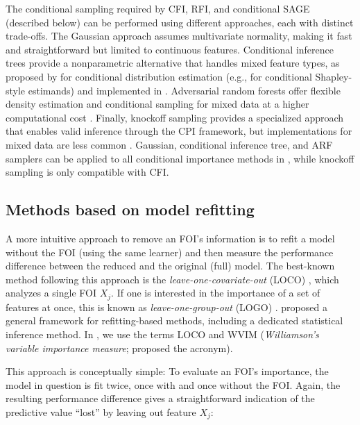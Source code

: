 The conditional sampling required by CFI, RFI, and conditional SAGE (described below) can be performed using different approaches, each with distinct trade-offs.
The Gaussian approach assumes multivariate normality, making it fast and straightforward but limited to continuous features.
Conditional inference trees provide a nonparametric alternative that handles mixed feature types, as proposed by \citet{redelmeier2020explainingpredictive} for conditional distribution estimation (e.g., for conditional Shapley-style estimands) and implemented in .
Adversarial random forests offer flexible density estimation and conditional sampling for mixed data at a higher computational cost \citep{watson2023adversarialrandom}.
Finally, knockoff sampling provides a specialized approach that enables valid inference through the CPI framework, but implementations for mixed data are less common \citep{candes2018panninggoldd, blesch2024conditionalfeature}.
Gaussian, conditional inference tree, and ARF samplers can be applied to all conditional importance methods in , while knockoff sampling is only compatible with CFI.

\subsection{Methods based on model refitting}\label{sec-fi-refit}

A more intuitive approach to remove an FOI's information is to refit a model without the FOI (using the same learner) and then measure the performance difference between the reduced and the original (full) model.
The best-known method following this approach is the \emph{leave-one-covariate-out} (LOCO) \citep{lei2018distributionfreepredictivec}, which analyzes a single FOI \(X_j\).
If one is interested in the importance of a set of features at once,
this is known as \emph{leave-one-group-out} (LOGO) \citep{au2022grouped}.
\citet{williamson2023generalframeworkb} proposed a general framework for refitting-based methods, including a dedicated statistical inference method.
In , we use the terms LOCO and WVIM (\emph{Williamson's variable importance measure}; \citet{ewald2024guidefeatureb} proposed the acronym).

This approach is conceptually simple: To evaluate an FOI's importance, the model in question is fit twice, once with and once without the FOI.
Again, the resulting performance difference gives a straightforward indication of the predictive value ``lost'' by leaving out feature \(X_j\):

